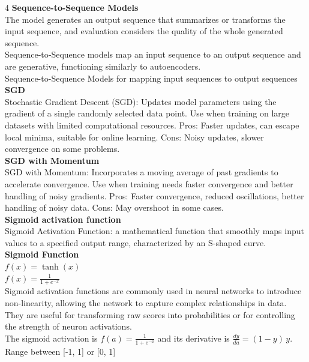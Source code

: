 \documentclass[8pt]{extarticle}
\begin{document}
\begin{multicols}{4}
\vspace{2pt}\textbf{Sequence-to-Sequence Models}\\
The model generates an output sequence that summarizes or transforms the input sequence, and evaluation considers the quality of the whole generated sequence.\\
Sequence‑to‑Sequence models map an input sequence to an output sequence and are generative, functioning similarly to autoencoders.\\
Sequence-to-Sequence Models for mapping input sequences to output sequences\\
\vspace{2pt}\textbf{SGD}\\
Stochastic Gradient Descent (SGD): Updates model parameters using the gradient of a single randomly selected data point. Use when training on large datasets with limited computational resources. Pros: Faster updates, can escape local minima, suitable for online learning. Cons: Noisy updates, slower convergence on some problems.\\
\vspace{2pt}\textbf{SGD with Momentum}\\
SGD with Momentum: Incorporates a moving average of past gradients to accelerate convergence. Use when training needs faster convergence and better handling of noisy gradients. Pros: Faster convergence, reduced oscillations, better handling of noisy data. Cons: May overshoot in some cases.\\
\vspace{2pt}\textbf{Sigmoid activation function}\\
Sigmoid Activation Function: a mathematical function that smoothly maps input values to a specified output range, characterized by an S‑shaped curve.\\
\vspace{2pt}\textbf{Sigmoid Function}\\
$f(x)=\tanh(x)$\\
$f(x)=\frac{1}{1+e^{-x}}$\\
Sigmoid activation functions are commonly used in neural networks to introduce non-linearity, allowing the network to capture complex relationships in data. They are useful for transforming raw scores into probabilities or for controlling the strength of neuron activations.\\
The sigmoid activation is $f(a)=\frac{1}{1+e^{-a}}$ and its derivative is $\frac{dy}{da}=(1-y)\,y$.\\
Range between [-1, 1] or [0, 1]\\

\end{multicols}
\end{document}
